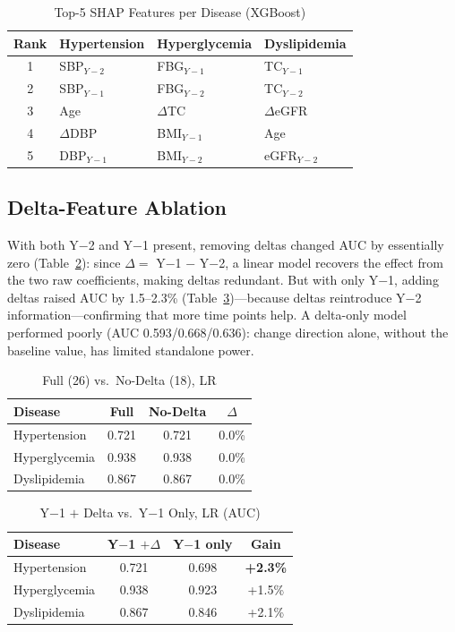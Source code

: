 \documentclass[journal]{IEEEtran}
\begin{document}
\begin{table}[!t]
\caption{Top-5 SHAP Features per Disease (XGBoost)}
\label{tab:shap}
\centering
\begin{tabular}{@{}clll@{}}
\toprule
Rank & Hypertension & Hyperglycemia & Dyslipidemia \\
\midrule
1 & SBP$_{Y-2}$ & FBG$_{Y-1}$ & TC$_{Y-1}$ \\
2 & SBP$_{Y-1}$ & FBG$_{Y-2}$ & TC$_{Y-2}$ \\
3 & Age & $\Delta$TC & $\Delta$eGFR \\
4 & $\Delta$DBP & BMI$_{Y-1}$ & Age \\
5 & DBP$_{Y-1}$ & BMI$_{Y-2}$ & eGFR$_{Y-2}$ \\
\bottomrule
\end{tabular}
\end{table}

\subsection{Delta-Feature Ablation}
With both Y$-$2 and Y$-$1 present, removing deltas changed AUC by essentially zero (Table~\ref{tab:full}): since $\Delta = $ Y$-$1 $-$ Y$-$2, a linear model recovers the effect from the two raw coefficients, making deltas redundant. But with only Y$-$1, adding deltas raised AUC by 1.5--2.3\% (Table~\ref{tab:y1})---because deltas reintroduce Y$-$2 information---confirming that more time points help. A delta-only model performed poorly (AUC 0.593/0.668/0.636): change direction alone, without the baseline value, has limited standalone power.

\begin{table}[!t]
\caption{Full (26) vs.\ No-Delta (18), LR}
\label{tab:full}
\centering
\begin{tabular}{@{}lccc@{}}
\toprule
Disease & Full & No-Delta & $\Delta$ \\
\midrule
Hypertension & 0.721 & 0.721 & 0.0\% \\
Hyperglycemia & 0.938 & 0.938 & 0.0\% \\
Dyslipidemia & 0.867 & 0.867 & 0.0\% \\
\bottomrule
\end{tabular}
\end{table}

\begin{table}[!t]
\caption{Y$-$1 $+$ Delta vs.\ Y$-$1 Only, LR (AUC)}
\label{tab:y1}
\centering
\begin{tabular}{@{}lccc@{}}
\toprule
Disease & Y$-$1 $+\Delta$ & Y$-$1 only & Gain \\
\midrule
Hypertension & 0.721 & 0.698 & \textbf{+2.3\%} \\
Hyperglycemia & 0.938 & 0.923 & +1.5\% \\
Dyslipidemia & 0.867 & 0.846 & +2.1\% \\
\bottomrule
\end{tabular}
\end{table}
\end{document}
